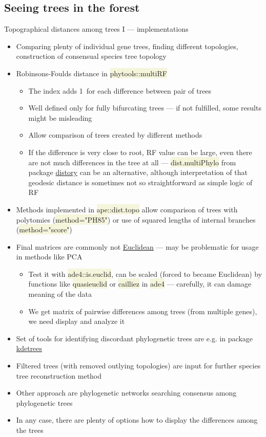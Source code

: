 \documentclass[compress, xelatex, 11pt, xcolor=svgnames, aspectratio=169,
	hyperref={
		bookmarks=true,
		unicode=true,
		colorlinks=true,
		pdftitle={Molecular data in R},
		plainpages=false,
		pdfauthor={Vojtech Zeisek},
		pdfsubject={Course about phylogeny and evolution in R},
		pdfcreator={XeLaTeX},
		pdfkeywords={R, evolution, phylogeny, molecular data},
		linkcolor=Crimson, %
		anchorcolor=Magenta, %
		citecolor=Magenta, %
		filecolor=Magenta, %
		menucolor=Magenta, %
		urlcolor=DodgerBlue, %
		},
	url={hyphens, lowtilde} %
	]{beamer}
\renewcommand{\texttt}[1]{\colorbox{Beige}{{\ttfamily #1}}}
\begin{document}
\subsection{Seeing trees in the forest}

\begin{frame}[allowframebreaks]{Topographical distances among trees I --- implementations}
	\begin{itemize}
		\item Comparing plenty of individual gene trees, finding different topologies, construction of consensual species tree topology
		\item Robinsons-Foulds distance in \texttt{phytools::multiRF}
		\begin{itemize}
			\item The index adds 1~for each difference between pair of trees
			\item Well defined only for fully bifurcating trees --- if not fulfilled, some results might be misleading
			\item Allow comparison of trees created by different methods
			\item If the difference is very close to root, RF value can be large, even there are not much differences in the tree at all --- \texttt{dist.multiPhylo} from package \href{https://CRAN.R-project.org/package=distory}{distory} can be an alternative, although interpretation of that geodesic distance is sometimes not so straightforward as simple logic of RF
		\end{itemize}
		\item Methods implemented in \texttt{ape::dist.topo} allow comparison of trees with polytomies (\texttt{method="PH85"}) or use of squared lengths of internal branches (\texttt{method="score"})
		\item Final matrices are commonly not \href{https://en.wikipedia.org/wiki/Euclidean_distance_matrix}{Euclidean} --- may be problematic for usage in methods like PCA
		\begin{itemize}
			\item Test it with \texttt{ade4::is.euclid}, can be scaled (forced to became Euclidean) by functions like \texttt{quasieuclid} or \texttt{cailliez} in \texttt{ade4} --- carefully, it can damage meaning of the data
			\item We get matrix of pairwise differences among trees (from multiple genes), we need display and analyze it
		\end{itemize}
		\item Set of tools for identifying discordant phylogenetic trees are e.g. in package \href{https://github.com/V-Z/kdetrees}{kdetrees}
		\item Filtered trees (with removed outlying topologies) are input for further species tree reconstruction method
		\item Other approach are phylogenetic networks searching consensus among phylogenetic trees
		\item In any case, there are plenty of options how to display the differences among the trees
	\end{itemize}
\end{frame}
\end{document}
